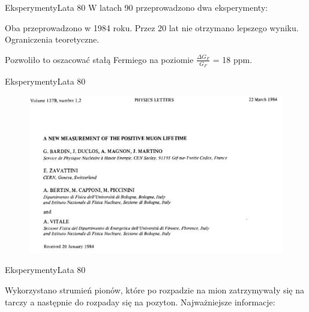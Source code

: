 \documentclass[xcolor={dvipsnames}]{beamer}
\begin{document}
\begin{frame}{Eksperymenty}{Lata 80}
    W latach 90 przeprowadzono dwa eksperymenty:

    \begin{outline}[enumerate]
        \1 Oba przeprowadzono w 1984 roku.
        \1 Przez 20 lat nie otrzymano lepszego wyniku.
        \1 Ograniczenia teoretyczne.

    \end{outline}

    Pozwoliło to oszacować stałą Fermiego na poziomie $\frac{\Delta G_F}{G_F}$ = 18 ppm.

\end{frame}

\begin{frame}{Eksperymenty}{Lata 80}

    \begin{figure}
        \includegraphics[scale=0.7]{positive1_bardin.PNG}

    \end{figure}

\end{frame}

\begin{frame}{Eksperymenty}{Lata 80}

    Wykorzystano strumień pionów, które po rozpadzie na mion zatrzymywały się na tarczy a następnie do rozpaday się na pozyton. Najważniejsze informacje:
    
    \begin{outline}[enumerate]
        
        
    \end{outline}

\end{frame}
\end{document}
